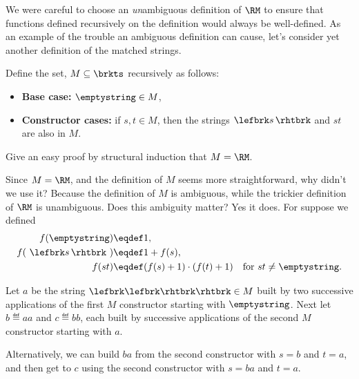 \begin{definition}
We were careful to choose an \emph{un}ambiguous definition of $\RM$ to
ensure that functions defined recursively on the definition would always
be well-defined.  As an example of the trouble an ambiguous definition can
cause, let's consider yet another definition of the matched strings.

\iffalse Recursive definitions of tagged data types, where the tag
uniquely determines the rule used to construct an element, are guaranteed
to be unambiguous.
\fi

\begin{example}\label{M}
  Define the set, $M \subseteq \brkts$ recursively as follows:
\begin{itemize}

\item \textbf{Base case:} $\emptystring \in M$,

\item \textbf{Constructor cases:} if $s,t \in M$, then
  the strings $\lefbrk s\, \rhtbrk$ and $st$ are also in $M$.
\end{itemize}
\end{example}

\begin{notesproblem}
Give an easy proof by structural induction that $M =\RM$.
\end{notesproblem}

Since $M = \RM$, and the definition of $M$ seems more straightforward, why
didn't we use it?  Because the definition of $M$ is ambiguous, while the
trickier definition of $\RM$ is unambiguous.  Does this ambiguity matter?
Yes it does.  For suppose we defined
\begin{align*}
  f(\emptystring)        & \eqdef 1,\\
  f(\ \lefbrk s\,\rhtbrk\ ) & \eqdef 1+ f(s),\\
  f(st)                  & \eqdef (f(s)+1) \cdot (f(t)+1)
                            & \text{for } st\neq \emptystring.
\end{align*}

Let $a$ be the string $\lefbrk\lefbrk\rhtbrk\rhtbrk \in M$ built by two successive
applications of the first $M$ constructor starting with $\emptystring$.  Next
let $b \eqdef aa$ and $c \eqdef bb$, each built by successive applications
of the second $M$ constructor starting with $a$.

Alternatively, we can build $ba$ from the second constructor with $s=b$
and $t=a$, and then get to $c$ using the second constructor with $s=ba$
and $t=a$.


\end{definition}
